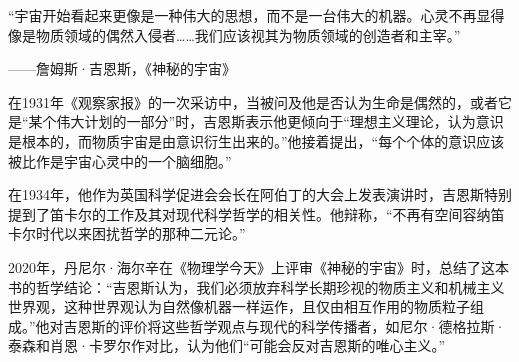 “宇宙开始看起来更像是一种伟大的思想，而不是一台伟大的机器。心灵不再显得像是物质领域的偶然入侵者……我们应该视其为物质领域的创造者和主宰。”

——詹姆斯·吉恩斯，《神秘的宇宙》

在1931年《观察家报》的一次采访中，当被问及他是否认为生命是偶然的，或者它是“某个伟大计划的一部分”时，吉恩斯表示他更倾向于“理想主义理论，认为意识是根本的，而物质宇宙是由意识衍生出来的。”他接着提出，“每个个体的意识应该被比作是宇宙心灵中的一个脑细胞。”

在1934年，他作为英国科学促进会会长在阿伯丁的大会上发表演讲时，吉恩斯特别提到了笛卡尔的工作及其对现代科学哲学的相关性。他辩称，“不再有空间容纳笛卡尔时代以来困扰哲学的那种二元论。”

2020年，丹尼尔·海尔辛在《物理学今天》上评审《神秘的宇宙》时，总结了这本书的哲学结论：“吉恩斯认为，我们必须放弃科学长期珍视的物质主义和机械主义世界观，这种世界观认为自然像机器一样运作，且仅由相互作用的物质粒子组成。”他对吉恩斯的评价将这些哲学观点与现代的科学传播者，如尼尔·德格拉斯·泰森和肖恩·卡罗尔作对比，认为他们“可能会反对吉恩斯的唯心主义。”